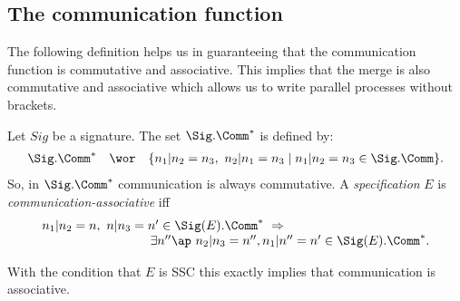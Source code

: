 \documentclass[twoside,fleqn,a4paper,dvips]{article}
\begin{document}
\subsection{The communication function}
The following definition helps us in guaranteeing that the
communication function is commutative and associative. This implies
that the merge is also commutative and associative which allows us to
write parallel processes without brackets. 
\begin{Dn}
Let $Sig$ be a signature. The set $\Sig.\Comm^*$ is defined by:
\[\begin{array}{rcl}
\Sig.\Comm^*&\wor&\{n_1| n_2=n_3,~ n_2| n_1=n_3 \mid
n_1| n_2=n_3\in \Sig.\Comm\}.
\end{array}\]
So, in $\Sig.\Comm^*$ communication is always commutative. A
{\it specification} $E$ is {\it communication-associative} iff
\[
\begin{array}{l}
n_1| n_2= n,~ n| n_3=n'\in
\Sig(E).\Comm^*~\Rightarrow\\
\hspace*{3cm}\exists n''\ap ~n_2| n_3=n'',
n_1| n''= n' \in \Sig(E).\Comm^*.
\end{array}
\]
\end{Dn}
With the condition that $E$ is SSC
this exactly implies that communication is associative.
\end{document}
